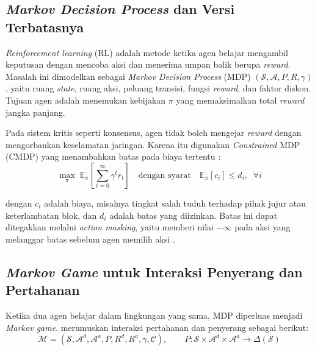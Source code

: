 \subsection{\textit{Markov Decision Process} dan Versi Terbatasnya}
\label{subsec:cmdp}
\textit{Reinforcement learning} (RL) adalah metode ketika agen belajar mengambil keputusan dengan mencoba aksi dan menerima umpan balik berupa \textit{reward}. Masalah ini dimodelkan sebagai \textit{Markov Decision Process} (MDP) $(\mathcal{S}, \mathcal{A}, P, R, \gamma)$, yaitu ruang \textit{state}, ruang aksi, peluang transisi, fungsi \textit{reward}, dan faktor diskon. Tujuan agen adalah menemukan kebijakan $\pi$ yang memaksimalkan total \textit{reward} jangka panjang.

Pada sistem kritis seperti konsensus, agen tidak boleh mengejar \textit{reward} dengan mengorbankan keselamatan jaringan. Karena itu digunakan \textit{Constrained} MDP (CMDP) yang menambahkan batas pada biaya tertentu \parencite{skowronski2026adaptive}:
\begin{equation}
\max_{\pi} \; \mathbb{E}_{\pi}\left[\sum_{t=0}^{\infty} \gamma^{t} r_t\right] \quad \text{dengan syarat} \quad \mathbb{E}_{\pi}[c_i] \leq d_i, \;\; \forall i
\label{eq:cmdp}
\end{equation}

\noindent dengan $c_i$ adalah biaya, misalnya tingkat salah tuduh terhadap pihak jujur atau keterlambatan blok, dan $d_i$ adalah batas yang diizinkan. Batas ini dapat ditegakkan melalui \textit{action masking}, yaitu memberi nilai $-\infty$ pada aksi yang melanggar batas sebelum agen memilih aksi \parencite{skowronski2026adaptive}.

\subsection{\textit{Markov Game} untuk Interaksi Penyerang dan Pertahanan}
\label{subsec:markov_game}
Ketika dua agen belajar dalam lingkungan yang sama, MDP diperluas menjadi \textit{Markov game}. \textcite{wushishi2026coadam} merumuskan interaksi pertahanan dan penyerang sebagai berikut:
\begin{equation}
\mathcal{M} = \left(\mathcal{S}, \mathcal{A}^{d}, \mathcal{A}^{a}, P, R^{d}, R^{a}, \gamma, \mathcal{C}\right), \qquad P: \mathcal{S} \times \mathcal{A}^{d} \times \mathcal{A}^{a} \rightarrow \Delta(\mathcal{S})
\label{eq:markov_game}
\end{equation}

